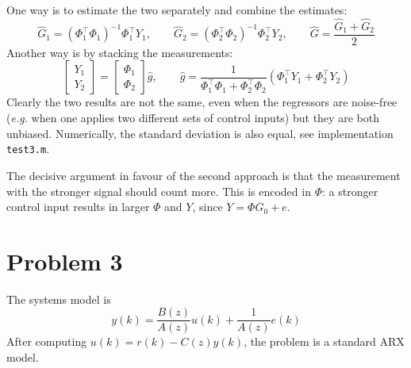\documentclass[11pt]{article}
\begin{document}
One way is to estimate the two separately and combine the estimates:
\begin{equation*}
  \hat{G}_1 = (\Phi_1^\top \Phi_1)^{-1}\Phi_1^\top Y_1,\hspace{2em} \hat{G}_2 = (\Phi_2^\top \Phi_2)^{-1}\Phi_2^\top Y_2, \hspace{2em}\hat{G} = \frac{\hat{G}_1 + \hat{G}_2}{2}
\end{equation*}
Another way is by stacking the measurements:
\begin{equation*}
  \begin{bmatrix}
    Y_1 \\ Y_2
  \end{bmatrix} =
  \begin{bmatrix}
    \Phi_1 \\ \Phi_2
  \end{bmatrix}\hat{g},\hspace{2em} \hat{g} = \frac{1}{\Phi_1^\top \Phi_1 + \Phi_2^\top \Phi_2}(\Phi_1^\top Y_1 + \Phi_2^\top Y_2)
\end{equation*}
Clearly the two results are not the same, even when the regressors are noise-free (\textit{e.g.} when one applies two different sets of control inputs) but they are both unbiased. Numerically, the standard deviation is also equal, see implementation \texttt{test3.m}.

The decisive argument in favour of the second approach is that the measurement with the stronger signal should count more. This is encoded in $\Phi$: a stronger control input results in larger $\Phi$ and $Y$, since $Y = \Phi G_0 + e$.


\section*{Problem 3}
\label{sec:prob3}

The systems model is
\begin{equation*}
  y(k) = \frac{B(z)}{A(z)}u(k) + \frac{1}{A(z)}e(k)
\end{equation*}
After computing $u(k)=r(k)-C(z)y(k)$, the problem is a standard ARX model.
\end{document}
